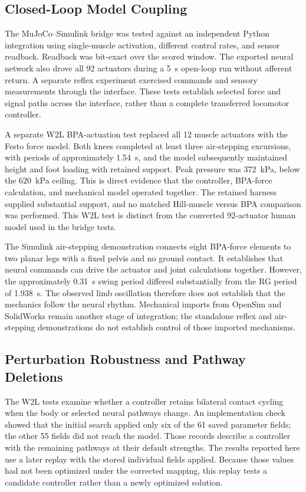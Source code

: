 \subsection{Closed-Loop Model Coupling}

The MuJoCo--Simulink bridge was tested against an independent Python integration using single-muscle activation, different control rates, and sensor readback. Readback was bit-exact over the scored window. The exported neural network also drove all 92 actuators during a \qty{5}{\second} open-loop run without afferent return. A separate reflex experiment exercised commands and sensory measurements through the interface. These tests establish selected force and signal paths across the interface, rather than a complete transferred locomotor controller.

A separate W2L BPA-actuation test replaced all 12 muscle actuators with the Festo force model. Both knees completed at least three air-stepping excursions, with periods of approximately \qty{1.54}{\second}, and the model subsequently maintained height and foot loading with retained support. Peak pressure was \qty{372}{\kPa}, below the \qty{620}{\kPa} ceiling. This is direct evidence that the controller, BPA-force calculation, and mechanical model operated together. The retained harness supplied substantial support, and no matched Hill-muscle versus BPA comparison was performed. This W2L test is distinct from the converted 92-actuator human model used in the bridge tests.

The Simulink air-stepping demonstration connects eight BPA-force elements to two planar legs with a fixed pelvis and no ground contact. It establishes that neural commands can drive the actuator and joint calculations together. However, the approximately \qty{0.31}{\second} swing period differed substantially from the RG period of \qty{1.938}{\second}. The observed limb oscillation therefore does not establish that the mechanics follow the neural rhythm. Mechanical imports from OpenSim and SolidWorks remain another stage of integration; the standalone reflex and air-stepping demonstrations do not establish control of those imported mechanisms.

\subsection{Perturbation Robustness and Pathway Deletions}\label{sec:w2l_perturbation}

The W2L tests examine whether a controller retains bilateral contact cycling when the body or selected neural pathways change. An implementation check showed that the initial search applied only six of the 61 saved parameter fields; the other 55 fields did not reach the model. Those records describe a controller with the remaining pathways at their default strengths. The results reported here use a later replay with the stored individual fields applied. Because those values had not been optimized under the corrected mapping, this replay tests a candidate controller rather than a newly optimized solution.

